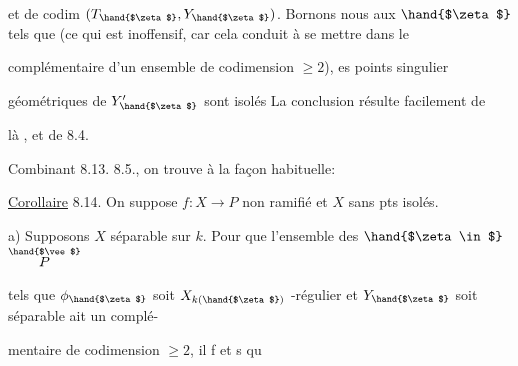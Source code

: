 et de codim $(T_{\hand{$\zeta$}},Y_{\hand{$\zeta$}})$. Bornons nous aux $\hand{$\zeta$}$ tels que \hand{)}
\margin{$*$} 
\hand{/}(ce qui est inoffensif, car  cela conduit à se mettre dans le

complémentaire d'un ensemble de codimension $\geq 2$\hand{\unsure{$\zeta$}$\}$}), es points singulier

géométriques de $Y'_{\hand{$\zeta$}}$ sont  isolés La conclusion résulte facilement de

là , et de 8.4. 

Combinant 8.13.  8.5.\hand{/}, on trouve à la façon habituelle:

\uline{Corollaire} 8.14. On suppose $f:X\rightarrow P$ non ramifié et $X$ sans pts isolés.

 a) Supposons $X$ séparable sur $k$. Pour que l'ensemble  des $\hand{$\zeta \in$}$ $\overset{\hand{$\vee$}}{P}$

tels que $\phi_{\hand{$\zeta$}}$ soit $X_{k(\hand{$\zeta$})}$ -régulier et $Y_{\hand{$\zeta$}}$ soit séparable ait un complé-%

mentaire de codimension $\geq 2$, il f et s qu

